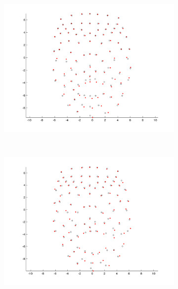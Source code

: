 \begin{figure}[htbp!]
\begin{subfigure}[b]{0.3\textwidth}
        \end{subfigure}
        ~ %
        \begin{subfigure}[b]{0.3\textwidth}
                \includegraphics[trim = 10mm 0mm 10mm 0mm,clip,width=\textwidth]{img/weights/3D/19blends/w2_frame600_blends19.png} 
        \end{subfigure} \\
        \begin{subfigure}[b]{0.3\textwidth}
                \includegraphics[trim = 10mm 0mm 10mm 0mm,clip,width=\textwidth]{img/weights/3D/19blends/w3_frame200_blends19.png}

\end{subfigure}
\end{figure}
